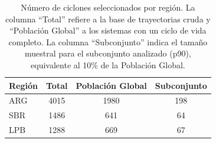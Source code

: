 \begin{table}[htbp]
\centering
\caption[Número de ciclones seleccionados por región]{Número de ciclones seleccionados por región. La columna ``Total'' refiere a la base de trayectorias cruda y ``Población Global'' a los sistemas con un ciclo de vida completo. La columna ``Subconjunto'' indica el tamaño muestral para el subconjunto analizado (p90), equivalente al 10\% de la Población Global.}
\label{tab:conteo_ciclones}
\begin{tabular*}{\textwidth}{@{\extracolsep{\fill}}lccc}
\hline
Región & Total & Población Global & Subconjunto \\ 
\hline
ARG & 4015 & 1980 & 198 \\
SBR & 1486 & 641  & 64  \\
LPB & 1288 & 669  & 67  \\ 
\hline
\end{tabular*}
\end{table}

